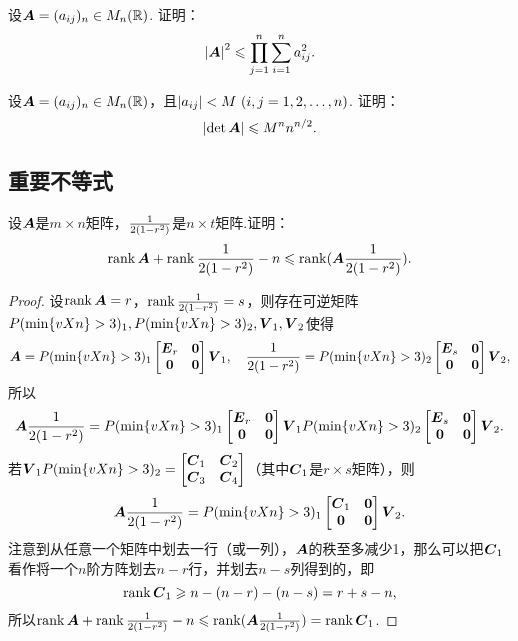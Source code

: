 \begin{example}
设\(\boldsymbol{A} = (a_{ij})_n \in M_n(\mathbb{R})\).
证明：\begin{equation}\label{equation:线性方程组.Hadamard不等式}
\abs{\boldsymbol{A}}^2 \leqslant \prod\limits_{j=1}^n \sum\limits_{i=1}^n a_{ij}^2.
\end{equation}
\end{example}

\begin{example}
设\(\boldsymbol{A} = (a_{ij})_n \in M_n(\mathbb{R})\)，且\(\abs{a_{ij}} < M\ (i,j=1,2,\dotsc,n)\).
证明：\begin{equation}
\abs{\det\boldsymbol{A}} \leqslant M^n n^{n/2}.
\end{equation}
\end{example}

\subsection{重要不等式}
\begin{theorem}
设\(\boldsymbol{A}\)是\(m \times n\)矩阵，\(\frac{1}{2(1-r^2)}\)是\(n \times t\)矩阵.证明：\begin{equation}\label{equation:线性方程组.西尔维斯特不等式}
\rank\boldsymbol{A} + \rank\frac{1}{2(1-r^2)} - n \leqslant \rank(\boldsymbol{A} \frac{1}{2(1-r^2)}).
\end{equation}
\begin{proof}
\def\AA{\P_1 \begin{bmatrix} \E_r & \z \\ \z & \z \end{bmatrix} \Q_1}
\def\BB{\P_2 \begin{bmatrix} \E_s & \z \\ \z & \z \end{bmatrix} \Q_2}
\def\CC#1{\C_{#1}}
设\(\rank\boldsymbol{A} = r\)，\(\rank\frac{1}{2(1-r^2)} = s\)，则存在可逆矩阵\(\P_1,\P_2,\Q_1,\Q_2\)使得\[
\A = \AA,
\quad
\B = \BB,
\]所以\[
\A \B = \AA \BB.
\]若\(\Q_1 \P_2 = \begin{bmatrix} \CC1 & \CC2 \\ \CC3 & \CC4 \end{bmatrix}\)（其中\(\CC1\)是\(r \times s\)矩阵），则\[
\A \B = \P_1 \begin{bmatrix} \CC1 & \z \\ \z & \z \end{bmatrix} \Q_2.
\]
注意到从任意一个矩阵中划去一行（或一列），\(\boldsymbol{A}\)的秩至多减少1，那么可以把\(\CC1\)看作将一个\(n\)阶方阵划去\(n-r\)行，并划去\(n-s\)列得到的，即\[
\rank\CC1 \geqslant n - (n-r) - (n-s) = r+s-n,
\]所以\(\rank\A + \rank\B - n \leqslant \rank(\A \B) = \rank\CC1\).
\end{proof}
\end{theorem}

